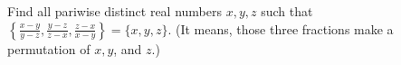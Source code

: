Find all pariwise distinct real numbers $x,y,z$ such that $\left\{\frac{x-y}{y-z},\frac{y-z}{z-x},\frac{z-x}{x-y} \right\} = \{x,y,z\}$. (It means, those three fractions make a permutation of $x, y$, and $z$.)